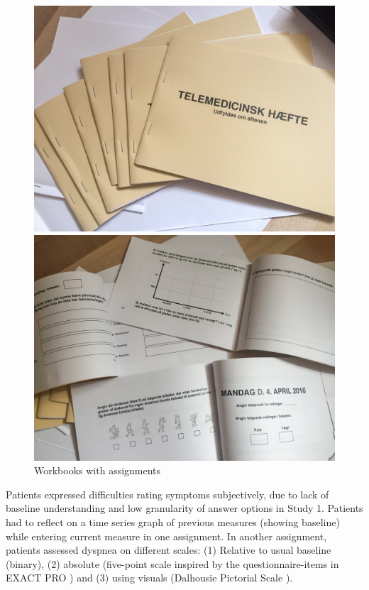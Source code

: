 \begin{figure}[!htb]
 \centering
 \begin{minipage}[b]{0.23\textwidth}
   \includegraphics[width=\textwidth]{img/workbook}
 \end{minipage}
 \hfill
 \begin{minipage}[b]{0.23\textwidth}
   \includegraphics[width=\textwidth]{img/workbook2}
 \end{minipage}
  \caption{Workbooks with assignments}
\end{figure}


Patients expressed difficulties rating symptoms subjectively, due to lack of baseline understanding and low granularity of answer options in Study 1. Patients had to reflect on a time series graph of previous measures (showing baseline) while entering current measure in one assignment. In another assignment, patients assessed dyspnea on different scales: (1) Relative to usual baseline (binary), (2) absolute (five-point scale inspired by the questionnaire-items in EXACT PRO \cite{exact}) and (3) using visuals (Dalhousie Pictorial Scale \cite{dalhousie}). 


